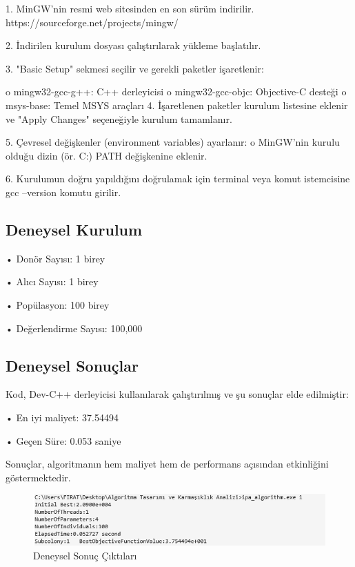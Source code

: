 \documentclass[12pt,a4paper]{article}
\begin{document}
1.	MinGW'nin resmi web sitesinden en son sürüm indirilir. https://sourceforge.net/projects/mingw/

2.	İndirilen kurulum dosyası çalıştırılarak yükleme başlatılır.

3.	"Basic Setup" sekmesi seçilir ve gerekli paketler işaretlenir:

o	mingw32-gcc-g++: C++ derleyicisi
o	mingw32-gcc-objc: Objective-C desteği
o	msys-base: Temel MSYS araçları
4.	İşaretlenen paketler kurulum listesine eklenir ve "Apply Changes" seçeneğiyle kurulum tamamlanır.

5.	Çevresel değişkenler (environment variables) ayarlanır:  
o	MinGW'nin kurulu olduğu dizin (ör. C:\MinGW\bin) PATH değişkenine eklenir.

6.	Kurulumun doğru yapıldığını doğrulamak için terminal veya komut istemcisine gcc --version komutu girilir.
\subsection{Deneysel Kurulum}
•	Donör Sayısı: 1 birey

•	Alıcı Sayısı: 1 birey

•	Popülasyon: 100 birey

•	Değerlendirme Sayısı: 100,000

\subsection{Deneysel Sonuçlar}
Kod, Dev-C++ derleyicisi kullanılarak çalıştırılmış ve şu sonuçlar elde edilmiştir:

•	En iyi maliyet: 37.54494

•	Geçen Süre: 0.053 saniye

Sonuçlar, algoritmanın hem maliyet hem de performans açısından etkinliğini göstermektedir.

\begin{figure}[h!]
    \centering
    \includegraphics[width=0.5\linewidth]{4.png}
    \caption{Deneysel Sonuç Çıktıları}
    \label{fig:results}
\end{figure}
\end{document}

